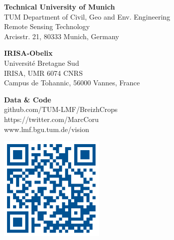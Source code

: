 \documentclass[a0]{tumposter}
\begin{document}
\begin{footer}
	\begin{minipage}{.33\textwidth}
		\textbf{Technical University of Munich}\footnotemark[1]\\
		TUM Department of Civil, Geo and Env. Engineering \\
		Remote Sensing Technology \\
		Arcisstr. 21, 80333 Munich, Germany
	\end{minipage}
	\begin{minipage}{.33\textwidth}
		\textbf{IRISA-Obelix}\footnotemark[2]\\
		Université Bretagne Sud \\
		IRISA, UMR 6074 CNRS \\
		Campus de Tohannic, 56000 Vannes, France
		
	\end{minipage}
	\begin{minipage}{.23\textwidth}
		\textbf{Data \& Code} \\
		{github.com/TUM-LMF/BreizhCrops} \\
		{https://twitter.com/MarcCoru} \\
		www.lmf.bgu.tum.de/vision
	\end{minipage}
	\begin{minipage}{.10\textwidth}
		\hfill\includegraphics[width=5cm]{images/qrcode}\\
		
	\end{minipage}

	
\end{footer}
\end{document}
